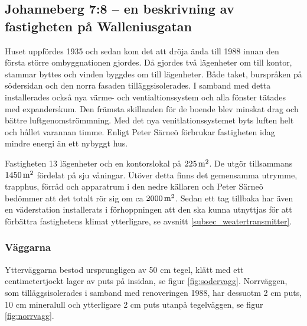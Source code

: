 \subsection{Johanneberg 7:8 – en beskrivning av fastigheten på Walleniusgatan}




Huset uppfördes 1935\cite{ritningar_urspr} och sedan kom det att dröja ända till 1988 innan den första större ombyggnationen gjordes. Då gjordes två lägenheter om till kontor, stammar byttes och vinden byggdes om till lägenheter. Både taket, burspråken på södersidan och den norra fasaden tilläggsisolerades. I samband med detta installerades också nya värme- och ventialtionssystem och alla fönster tätades med expanderskum. Den främsta skillnaden för de boende blev minskat drag och bättre luftgenomströmmning.  Med det nya venitlationssystemet byts luften helt och hållet varannan timme. Enligt Peter Särneö\cite{petersarneo} förbrukar fastigheten idag mindre energi än ett nybyggt hus.

Fastigheten 13 lägenheter och en kontorslokal på $\unit[225]{m^2}$. De utgör tillsammans $\unit[1450]{m^2}$ fördelat på sju våningar. Utöver detta finns det gemensamma utrymme, trapphus, förråd och apparatrum i den nedre källaren och Peter Särneö\cite{petersarneo} bedömmer att det totalt rör sig om ca $\unit[2000]{m^2}$. Sedan ett tag tillbaka har även en väderstation installerats i förhoppningen att den ska kunna utnyttjas för att förbättra fastighetens klimat ytterligare, se avsnitt \ref{subsec_weatertransmitter}.


\subsubsection{Väggarna}
Ytterväggarna bestod ursprungligen av 50 cm tegel, klätt med ett centimetertjockt lager av puts på insidan, se figur \ref{fig:sodervagg}. Norrväggen, som tilläggsisolerades i samband med renoveringen 1988, har dessuotm 2 cm puts, 10 cm mineralull och ytterligare 2 cm puts utanpå tegelväggen, se figur \ref{fig:norrvagg}.\cite{kandidatarbete2010}\cite{petersarneo}

